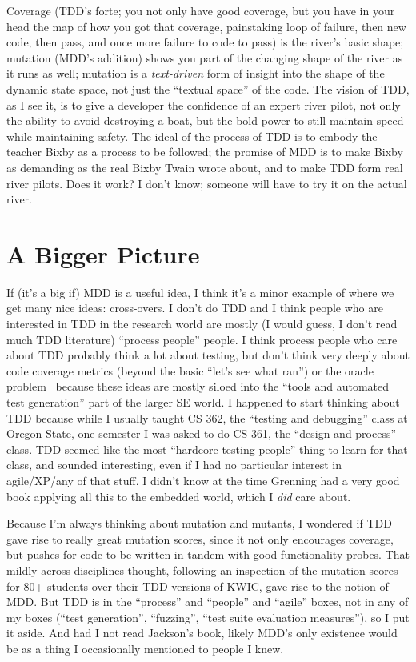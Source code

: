 \documentclass[sigplan,screen]{acmart}
\begin{document}
Coverage (TDD's forte; you not only have good coverage, but you have
in your head the map of how you got that coverage, painstaking loop of
failure, then new code, then pass, and once more failure to code to pass) is the river's basic
shape; mutation (MDD's addition) shows you part of the changing shape
of the river as it runs as well; mutation is a \emph{text-driven} form
of insight into the shape of the dynamic state space, not just the
``textual space'' of the code.  The vision of TDD, as I see it, is to
give a developer the confidence of an expert river pilot, not only the
ability to avoid destroying a boat, but the bold power to still
maintain speed while maintaining safety.  The ideal of the process of
TDD is to embody the teacher Bixby as a process to be followed; the
promise of MDD is to make Bixby as demanding as the real Bixby Twain
wrote about, and to make TDD form real river pilots.  Does it work?  I
don't know; someone will have to try it on the actual river.

\section{A Bigger Picture}

If (it's a big if) MDD is a useful idea, I think it's a minor example
of where we get many nice ideas:  cross-overs.  I don't do TDD and
I think people who are interested in TDD in the research world are
mostly (I would guess, I don't read much TDD literature) ``process people''
people.  I think process people who care about TDD probably think
a lot about testing, but don't think very deeply about code coverage
metrics (beyond the basic ``let's see what ran'') or the oracle
problem~\cite{staats2011programs,oracleMcMinn} because these ideas are mostly siloed into the ``tools and
automated test generation'' part of the larger SE world.  I happened
to start thinking about TDD because while I usually taught CS 362, the
``testing and debugging'' class at Oregon State, one semester I was
asked to do CS 361, the ``design and process'' class.  TDD seemed like
the most ``hardcore testing people'' thing to learn for that class,
and sounded interesting, even if I had no particular interest in
agile/XP/any of that stuff.  I didn't know at the time Grenning
had a very good book applying all this to the embedded world, which I
\emph{did} care about.

Because I'm always thinking about mutation and mutants, I wondered if
TDD gave rise to really great mutation scores, since it not only
encourages coverage, but pushes for code to be written in tandem with
good functionality probes.  That mildly across disciplines
thought, following an inspection of the mutation scores for 80+
students over their TDD versions of KWIC,
gave rise to the notion of MDD.  But TDD is in the ``process'' and
``people'' and ``agile'' boxes, not in any of my boxes (``test
generation'', ``fuzzing'', ``test suite evaluation measures''), so I
put it aside.  And had I not read Jackson's book, likely MDD's only
existence would be as a thing I occasionally mentioned to people I knew.
\end{document}
